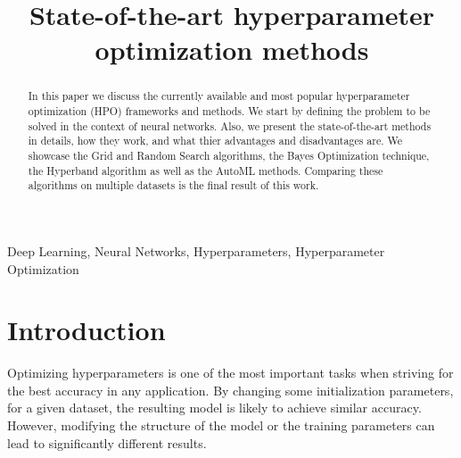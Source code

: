 \documentclass[conference]{IEEEtran}
\begin{document}

\title{State-of-the-art hyperparameter optimization methods}

\makeatletter
\newcommand{\linebreakand}{%
  \end{@IEEEauthorhalign}
  \hfill\mbox{}\par
  \mbox{}\hfill\begin{@IEEEauthorhalign}
}
\makeatother

\author{
\and
{}
}

\maketitle

\begin{abstract}
In this paper we discuss the currently available and most popular hyperparameter optimization (HPO) frameworks and methods. We start by defining the problem to be solved in the context of neural networks. Also, we present the state-of-the-art methods in details, how they work, and what thier advantages and disadvantages are. We showcase the Grid and Random Search algorithms, the Bayes Optimization technique, the Hyperband algorithm as well as the AutoML methods. Comparing these algorithms on multiple datasets is the final result of this work.
\end{abstract}

\begin{IEEEkeywords}
Deep Learning, Neural Networks, Hyperparameters, Hyperparameter Optimization
\end{IEEEkeywords}

\section{Introduction}
Optimizing hyperparameters is one of the most important tasks when striving for the best accuracy in any application. By changing some initialization parameters, for a given dataset, the resulting model is likely to achieve similar accuracy. However, modifying the structure of the model or the training parameters can lead to significantly different results.
\end{document}
